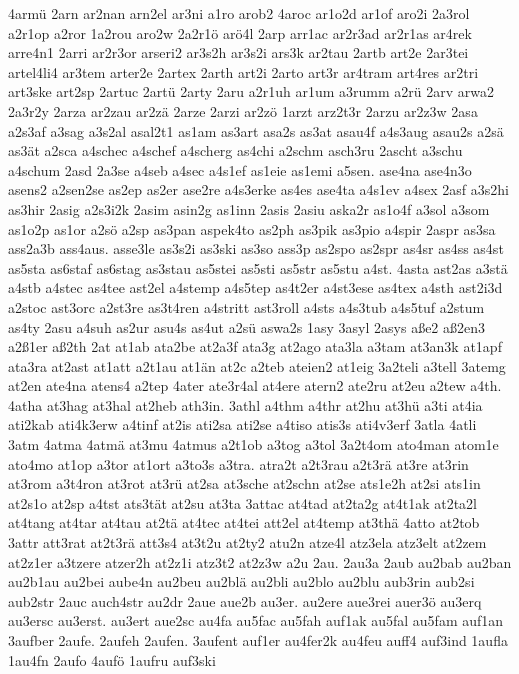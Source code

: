 {4armü
2arn
ar2nan
arn2el
ar3ni
a1ro
arob2
4aroc
ar1o2d
ar1of
aro2i
2a3rol
a2r1op
a2ror
1a2rou
aro2w
2a2r1ö
arö4l
2arp
arr1ac
ar2r3ad
ar2r1as
ar4rek
arre4n1
2arri
ar2r3or
arseri2
ar3s2h
ar3s2i
ars3k
ar2tau
2artb
art2e
2ar3tei
artel4li4
ar3tem
arter2e
2artex
2arth
art2i
2arto
art3r
ar4tram
art4res
ar2tri
art3ske
art2sp
2artuc
2artü
2arty
2aru
a2r1uh
ar1um
a3rumm
a2rü
2arv
arwa2
2a3r2y
2arza
ar2zau
ar2zä
2arze
2arzi
ar2zö
1arzt
arz2t3r
2arzu
ar2z3w
2asa
a2s3af
a3sag
a3s2al
asal2t1
as1am
as3art
asa2s
as3at
asau4f
a4s3aug
asau2s
a2sä
as3ät
a2sca
a4schec
a4schef
a4scherg
as4chi
a2schm
asch3ru
2ascht
a3schu
a4schum
2asd
2a3se
a4seb
a4sec
a4s1ef
as1eie
as1emi
a5sen.
ase4na
ase4n3o
asens2
a2sen2se
as2ep
as2er
ase2re
a4s3erke
as4es
ase4ta
a4s1ev
a4sex
2asf
a3s2hi
as3hir
2asig
a2s3i2k
2asim
asin2g
as1inn
2asis
2asiu
aska2r
as1o4f
a3sol
a3som
as1o2p
as1or
a2sö
a2sp
as3pan
aspek4to
as2ph
as3pik
as3pio
a4spir
2aspr
as3sa
ass2a3b
ass4aus.
asse3le
as3s2i
as3ski
as3so
ass3p
as2spo
as2spr
as4sr
as4ss
as4st
as5sta
as6staf
as6stag
as3stau
as5stei
as5sti
as5str
as5stu
a4st.
4asta
ast2as
a3stä
a4stb
a4stec
as4tee
ast2el
a4stemp
a4s5tep
as4t2er
a4st3ese
as4tex
a4sth
ast2i3d
a2stoc
ast3orc
a2st3re
as3t4ren
a4stritt
ast3roll
a4sts
a4s3tub
a4s5tuf
a2stum
as4ty
2asu
a4suh
as2ur
asu4s
as4ut
a2sü
aswa2s
1asy
3asyl
2asys
aße2
aß2en3
a2ß1er
aß2th
2at
at1ab
ata2be
at2a3f
ata3g
at2ago
ata3la
a3tam
at3an3k
at1apf
ata3ra
at2ast
at1att
a2t1au
at1än
at2c
a2teb
ateien2
at1eig
3a2teli
a3tell
3atemg
at2en
ate4na
atens4
a2tep
4ater
ate3r4al
at4ere
atern2
ate2ru
at2eu
a2tew
a4th.
4atha
at3hag
at3hal
at2heb
ath3in.
3athl
a4thm
a4thr
at2hu
at3hü
a3ti
at4ia
ati2kab
ati4k3erw
a4tinf
at2is
ati2sa
ati2se
a4tiso
atis3s
ati4v3erf
3atla
4atli
3atm
4atma
4atmä
at3mu
4atmus
a2t1ob
a3tog
a3tol
3a2t4om
ato4man
atom1e
ato4mo
at1op
a3tor
at1ort
a3to3s
a3tra.
atra2t
a2t3rau
a2t3rä
at3re
at3rin
at3rom
a3t4ron
at3rot
at3rü
at2sa
at3sche
at2schn
at2se
ats1e2h
at2si
ats1in
at2s1o
at2sp
a4tst
ats3tät
at2su
at3ta
3attac
at4tad
at2ta2g
at4t1ak
at2ta2l
at4tang
at4tar
at4tau
at2tä
at4tec
at4tei
att2el
at4temp
at3thä
4atto
at2tob
3attr
att3rat
at2t3rä
att3s4
at3t2u
at2ty2
atu2n
atze4l
atz3ela
atz3elt
at2zem
at2z1er
a3tzere
atzer2h
at2z1i
atz3t2
at2z3w
a2u
2au.
2au3a
2aub
au2bab
au2ban
au2b1au
au2bei
aube4n
au2beu
au2blä
au2bli
au2blo
au2blu
aub3rin
aub2si
aub2str
2auc
auch4str
au2dr
2aue
aue2b
au3er.
au2ere
aue3rei
auer3ö
au3erq
au3ersc
au3erst.
au3ert
aue2sc
au4fa
au5fac
au5fah
auf1ak
au5fal
au5fam
auf1an
3aufber
2aufe.
2aufeh
2aufen.
3aufent
auf1er
au4fer2k
au4feu
auff4
auf3ind
1aufla
1au4fn
2aufo
4aufö
1aufru
auf3ski
}
